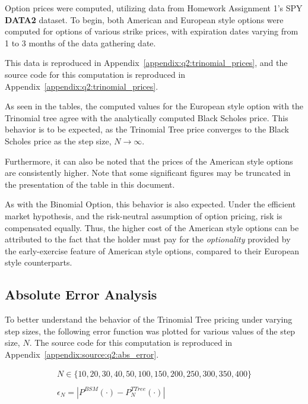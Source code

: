 \documentclass[10pt]{article}
\begin{document}
        Option prices were computed, utilizing data from Homework Assignment 1's SPY \textbf{DATA2} dataset. To begin, both American and European style options were computed for options of various strike prices, with expiration dates varying from 1 to 3 months of the data gathering date.
    
        This data is reproduced in Appendix~\ref{appendix:q2:trinomial_prices}, and the source code for this computation is reproduced in Appendix~\ref{appendix:q2:trinomial_prices}.
    
        As seen in the tables, the computed values for the European style option with the Trinomial tree agree with the analytically computed Black Scholes price. This behavior is to be expected, as the Trinomial Tree price converges to the Black Scholes price as the step size, $N \rightarrow \infty$.
    
        Furthermore, it can also be noted that the prices of the American style options are consistently higher. Note that some significant figures may be truncated in the presentation of the table in this document.
        
        As with the Binomial Option, this behavior is also expected. Under the efficient market hypothesis, and the risk-neutral assumption of option pricing, risk is compensated equally. Thus, the higher cost of the American style options can be attributed to the fact that the holder must pay for the \textit{optionality} provided by the early-exercise feature of American style options, compared to their European style counterparts.
    
    
        \subsection{Absolute Error Analysis}
        
        To better understand the behavior of the Trinomial Tree pricing under varying step sizes, the following error function was plotted for various values of the step size, $N$. The source code for this computation is reproduced in Appendix~\ref{appendix:source:q2:abs_error}.
    
        \begin{gather*}
            N \in \{10, 20, 30, 40, 50, 100, 150, 200, 250, 300, 350, 400\} \\
            \\
            \epsilon_N = \left| P^{BSM}(\cdot) - P^{TTree}_N(\cdot) \right|
        \end{gather*}
    
\end{document}
